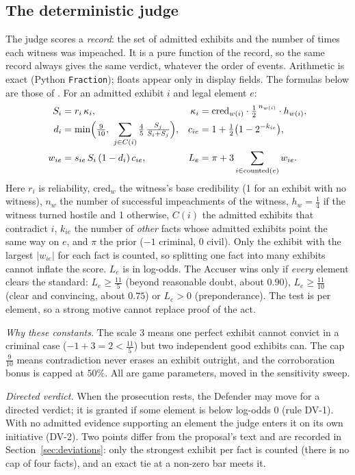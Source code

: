 \subsection{The deterministic judge}
The judge scores a \emph{record}: the set of admitted exhibits and the number of times each witness was impeached. It is a pure function of the record, so the same record always gives the same verdict, whatever the order of events. Arithmetic is exact (Python \texttt{Fraction}); floats appear only in display fields. The formulas below are those of . For an admitted exhibit $i$ and legal element $e$:
\begin{align*}
S_i &= r_i\,\kappa_i, & \kappa_i &= \text{cred}_{w(i)}\cdot\tfrac12^{\,n_{w(i)}}\cdot h_{w(i)},\\
d_i &= \min\Bigl(\tfrac{9}{10},\ \sum_{j\in C(i)}\tfrac45\,\tfrac{S_j}{S_i+S_j}\Bigr), & c_{ie} &= 1 + \tfrac12\bigl(1-2^{-k_{ie}}\bigr),\\
w_{ie} &= s_{ie}\,S_i\,(1-d_i)\,c_{ie}, & L_e &= \pi + 3\sum_{i\in\text{counted}(e)} w_{ie}.
\end{align*}
Here $r_i$ is reliability, $\text{cred}_{w}$ the witness's base credibility (1 for an exhibit with no witness), $n_w$ the number of successful impeachments of the witness, $h_w=\tfrac14$ if the witness turned hostile and 1 otherwise, $C(i)$ the admitted exhibits that contradict $i$, $k_{ie}$ the number of \emph{other} facts whose admitted exhibits point the same way on $e$, and $\pi$ the prior ($-1$ criminal, $0$ civil). Only the exhibit with the largest $|w_{ie}|$ for each fact is counted, so splitting one fact into many exhibits cannot inflate the score. $L_e$ is in log-odds. The Accuser wins only if \emph{every} element clears the standard: $L_e\ge \tfrac{11}{5}$ (beyond reasonable doubt, about $0.90$), $L_e\ge\tfrac{11}{10}$ (clear and convincing, about $0.75$) or $L_e>0$ (preponderance). The test is per element, so a strong motive cannot replace proof of the act.

\emph{Why these constants.} The scale 3 means one perfect exhibit cannot convict in a criminal case ($-1+3=2<\tfrac{11}{5}$) but two independent good exhibits can. The cap $\tfrac{9}{10}$ means contradiction never erases an exhibit outright, and the corroboration bonus is capped at $50\%$. All are game parameters, moved in the sensitivity sweep.

\emph{Directed verdict.} When the prosecution rests, the Defender may move for a directed verdict; it is granted if some element is below log-odds $0$ (rule DV-1). With no admitted evidence supporting an element the judge enters it on its own initiative (DV-2). Two points differ from the proposal's text and are recorded in Section~\ref{sec:deviations}: only the strongest exhibit per fact is counted (there is no cap of four facts), and an exact tie at a non-zero bar meets it.

